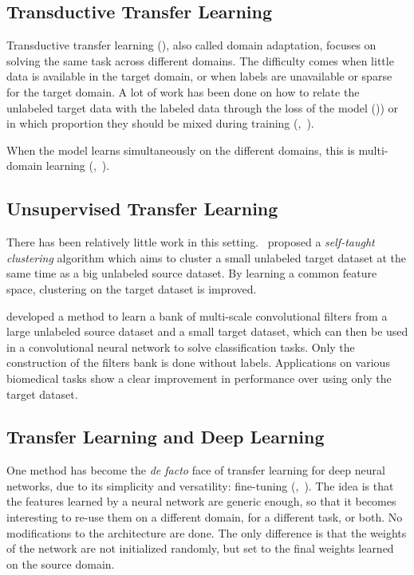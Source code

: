 \subsection{Transductive Transfer Learning}
\label{ssec:transductive}

Transductive transfer learning (\textcite{arnold2007}), also called domain adaptation, focuses on solving the same task across different domains. The difficulty comes when little data is available in the target domain, or when labels are unavailable or sparse for the target domain. A lot of work has been done on how to relate the unlabeled target data with the labeled data through the loss of the model (\textcite{arnold2007})) or in which proportion they should be mixed during training (\textcite{crammer2008JMLR},~\textcite{ben-david2010}).

When the model learns simultaneously on the different domains, this is multi-domain learning (\textcite{daume2007},~\textcite{joshi2013}).

\subsection{Unsupervised Transfer Learning}
\label{ssec:unsupervised}

There has been relatively little work in this setting.~\textcite{dai2008ICML} proposed a \textit{self-taught clustering} algorithm which aims to cluster a small unlabeled target dataset at the same time as a big unlabeled source dataset. By learning a common feature space, clustering on the target dataset is improved.

\textcite{chang2018} developed a method to learn a bank of multi-scale convolutional filters from a large unlabeled source dataset and a small target dataset, which can then be used in a convolutional neural network to solve classification tasks. Only the construction of the filters bank is done without labels. Applications on various biomedical tasks show a clear improvement in performance over using only the target dataset.

\subsection{Transfer Learning and Deep Learning}
\label{ssec:deep_transfer}

One method has become the \textit{de facto} face of transfer learning for deep neural networks, due to its simplicity and versatility: fine-tuning (\textcite{hinton2006},~\textcite{bengio2007NIPS}). The idea is that the features learned by a neural network are generic enough, so that it becomes interesting to re-use them on a different domain, for a different task, or both. No modifications to the architecture are done. The only difference is that the weights of the network are not initialized randomly, but set to the final weights learned on the source domain.

